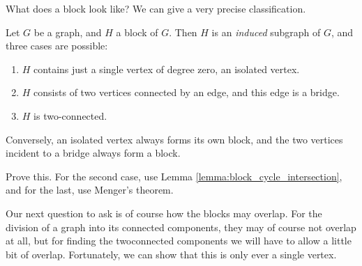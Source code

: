\documentclass[nobib]{tufte-handout}
\begin{document}
What does a block look like? We can give a very precise classification.

\begin{lemma}\label{lemma:classification_of_blocks}
  Let $G$ be a graph, and $H$ a block of $G$. Then $H$ is an \emph{induced} subgraph of $G$, and three cases are possible:
  \begin{enumerate}
    \item $H$ contains just a single vertex of degree zero, an isolated vertex.
    \item $H$ consists of two vertices connected by an edge, and this edge is a bridge.
    \item $H$ is two-connected.
  \end{enumerate}

  Conversely, an isolated vertex always forms its own block, and the two vertices incident to a bridge always form a block.

  \begin{xca}
    Prove this. For the second case, use Lemma \ref{lemma:block_cycle_intersection}, and for the last, use Menger's theorem.
  \end{xca}
\end{lemma}

Our next question to ask is of course how the blocks may overlap. For the division of a graph into its connected components, they may of course not overlap at all, but for finding the twoconnected components we will have to allow a little bit of overlap. Fortunately, we can show that this is only ever a single vertex.
\end{document}
